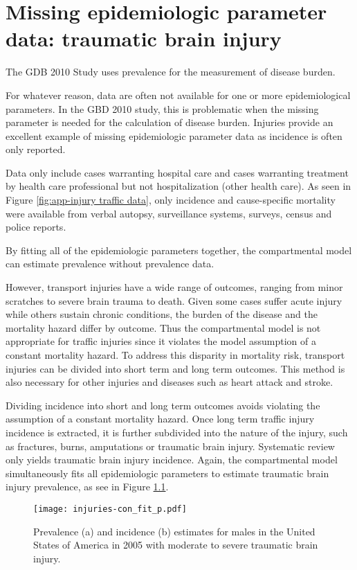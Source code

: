 \chapter{Missing epidemiologic parameter data: traumatic brain injury}
\label{applications-double_dismod}

The GDB 2010 Study uses prevalence for the measurement of disease burden.



For whatever reason, data are often not available for one or more
epidemiological parameters.  In the GBD 2010 study, this is
problematic when the missing parameter is needed for the calculation
of disease burden.  Injuries provide an excellent example of missing
epidemiologic parameter data as incidence is often only reported.

Data only include cases warranting hospital care and cases warranting
treatment by health care professional but not hospitalization (other
health care).  As seen in Figure \ref{fig:app-injury traffic data},
only incidence and cause-specific mortality were available from verbal
autopsy, surveillance systems, surveys, census and police reports.


By fitting all of the epidemiologic
parameters together, the compartmental model can estimate prevalence
without prevalence data.

However, transport injuries have a wide range of
outcomes, ranging from minor scratches to severe brain trauma to
death.  Given some cases suffer acute injury while others sustain
chronic conditions, the burden of the disease and the mortality hazard
differ by outcome.  Thus the compartmental model is not appropriate
for traffic injuries since it violates the model assumption of a
constant mortality hazard.  To address this disparity in mortality
risk, transport injuries can be divided into short term and long term
outcomes.  This method is also necessary for other injuries and
diseases such as heart attack and stroke.

Dividing incidence into short and long term outcomes avoids violating
the assumption of a constant mortality hazard.  Once long term traffic
injury incidence is extracted, it is further subdivided into the
nature of the injury, such as fractures, burns, amputations or
traumatic brain injury.  Systematic review only yields traumatic brain
injury incidence.  Again, the compartmental model simultaneously fits
all epidemiologic parameters to estimate traumatic brain injury
prevalence, as see in Figure \ref{fig:app-injury brain fit}.

    \begin{figure}[h]
        \begin{center}
            \texttt{[image: injuries-con\_fit\_p.pdf]}
            \caption{Prevalence (a) and incidence (b)
              estimates for males in the United States of America in
              2005 with moderate to severe traumatic brain injury.}
            \label{fig:app-injury brain fit}
        \end{center}
    \end{figure}



